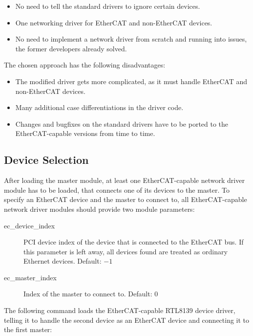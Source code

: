 \documentclass[a4paper,12pt,BCOR6mm,bibtotoc,idxtotoc]{scrbook}
\begin{document}
\begin{itemize}
\item No need to tell the standard drivers to ignore certain devices.
\item One networking driver for EtherCAT and non-EtherCAT devices.
\item No need to implement a network driver from scratch and running
  into issues, the former developers already solved.
\end{itemize}

The chosen approach has the following disadvantages:

\begin{itemize}
\item The modified driver gets more complicated, as it must handle
  EtherCAT and non-EtherCAT devices.
\item Many additional case differentiations in the driver code.
\item Changes and bugfixes on the standard drivers have to be ported
  to the Ether\-CAT-capable versions from time to time.
\end{itemize}


\subsection{Device Selection}
\label{sec:seldev}

After loading the master module, at least one EtherCAT-capable network
driver module has to be loaded, that connects one of its devices to
the master. To specify an EtherCAT device and the master to connect
to, all EtherCAT-capable network driver modules should provide two
module parameters:

\begin{description}
\item[ec\_device\_index] PCI device index of the device that is
  connected to the EtherCAT bus. If this parameter is left away, all
  devices found are treated as ordinary Ethernet devices. Default:
  $-1$
\item[ec\_master\_index] Index of the master to connect to. Default:
  $0$
\end{description}

The following command loads the EtherCAT-capable RTL8139 device
driver, telling it to handle the second device as an EtherCAT device
and connecting it to the first master:
\end{document}
